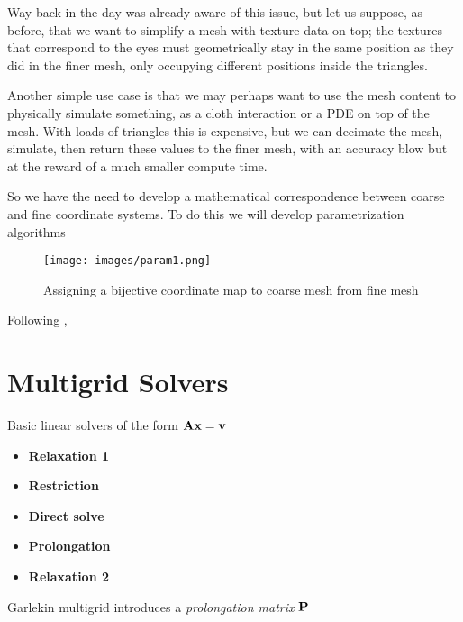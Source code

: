 Way back in the day \cite{LOD2} was already aware of this issue,
but let us suppose, as before, that we want to simplify a mesh with
texture data on top; the textures that correspond to the eyes must
geometrically stay in the same position as they did in the finer mesh,
only occupying different positions inside the triangles.

\spa

Another simple use case is that we may perhaps want to use the mesh
content to physically simulate something, as a cloth interaction
or a PDE on top of the mesh. With loads of triangles this is expensive,
but we can decimate the mesh, simulate, then return these values to the
finer mesh, with an accuracy blow but at the reward of a much smaller
compute time.

\spa

So we have the need to develop a mathematical correspondence between
coarse and fine coordinate systems. To do this we will develop
parametrization algorithms

\begin{figure}[h]
    \centering
    \texttt{[image: images/param1.png]}
    \caption{Assigning a bijective coordinate map to coarse mesh
    from fine mesh}
\end{figure}

Following \cite{param1} \cite{param2},

\section{Multigrid Solvers}

Basic linear solvers of the form $\bf{Ax = v}$

\begin{itemize}
    \item \textbf{Relaxation 1}
    \item \textbf{Restriction}
    \item \textbf{Direct solve}
    \item \textbf{Prolongation}
    \item \textbf{Relaxation 2}
\end{itemize}

Garlekin multigrid introduces a \emph{prolongation matrix} $\bf{P}$
